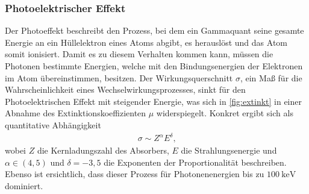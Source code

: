 \subsubsection{Photoelektrischer Effekt}
Der Photoeffekt beschreibt den Prozess, bei dem ein Gammaquant seine gesamte Energie an ein Hüllelektron eines Atoms abgibt, es herauslöst und das Atom somit ionisiert. Damit es zu diesem Verhalten kommen kann, müssen die Photonen bestimmte Energien, welche mit den Bindungsenergien der Elektronen im Atom übereinstimmen, besitzen.
Der Wirkungsquerschnitt $\sigma$, ein Maß für die Wahrscheinlichkeit eines Wechselwirkungsprozesses, sinkt für den Photoelektrischen Effekt mit steigender Energie, was sich in \autoref{fig:extinkt} in einer Abnahme des Extinktionskoeffizienten $\mu$ widerspiegelt.
Konkret ergibt sich als quantitative Abhängigkeit 
\begin{align}
  \sigma \sim Z^\alpha E^\delta\text{,}
\end{align}
wobei $Z$ die Kernladungszahl des Absorbers, $E$ die Strahlungsenergie und $\alpha \in(4,5)$ und $\delta = -3,5$ die Exponenten der Proportionalität beschreiben.
Ebenso ist ersichtlich, dass dieser Prozess für Photonenenergien bis zu $\SI{100}{\kilo\electronvolt}$ dominiert.

